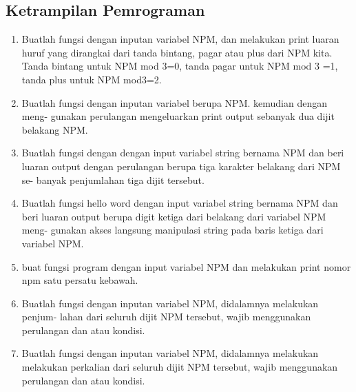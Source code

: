 \subsection{Ketrampilan Pemrograman}
\begin{enumerate}
    \item Buatlah fungsi dengan inputan variabel NPM, dan melakukan print luaran huruf
    yang dirangkai dari tanda bintang, pagar atau plus dari NPM kita. Tanda
    bintang untuk NPM mod 3=0, tanda pagar untuk NPM mod 3 =1, tanda plus
    untuk NPM mod3=2.
    

    \item Buatlah fungsi dengan inputan variabel berupa NPM. kemudian dengan meng-
    gunakan perulangan mengeluarkan print output sebanyak dua dijit belakang
    NPM.
    

    \item Buatlah fungsi dengan dengan input variabel string bernama NPM dan beri
    luaran output dengan perulangan berupa tiga karakter belakang dari NPM se-
    banyak penjumlahan tiga dijit tersebut.
    

    \item Buatlah fungsi hello word dengan input variabel string bernama NPM dan
    beri luaran output berupa digit ketiga dari belakang dari variabel NPM meng-
    gunakan akses langsung manipulasi string pada baris ketiga dari variabel NPM.
    

    \item buat fungsi program dengan input variabel NPM dan melakukan print nomor npm satu persatu kebawah.
    

    \item Buatlah fungsi dengan inputan variabel NPM, didalamnya melakukan penjum-
    lahan dari seluruh dijit NPM tersebut, wajib menggunakan perulangan dan
    atau kondisi.
    

    \item Buatlah fungsi dengan inputan variabel NPM, didalamnya melakukan melakukan
    perkalian dari seluruh dijit NPM tersebut, wajib menggunakan perulangan dan
    atau kondisi.
    


\end{enumerate}
